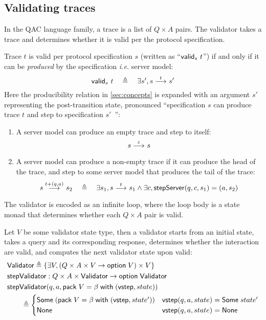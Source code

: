 \subsection{Validating traces}
In the QAC language family, a trace is a list of $Q\times A$ pairs.  The
validator takes a trace and determines whether it is valid per the protocol
specification.
\begin{definition}
  Trace $t$ is valid per protocol specification $s$ (written as ``$\mathsf{valid}_{s}~{t}$'') if and only if it can be {\em produced} by the specification {\it i.e.}
  server model:
  \[\mathsf{valid}_{s}~{t}\quad\triangleq\quad\exists s',s\overset{t}\longrightarrow_{} s'\]
  Here the producibility relation in \autoref{sec:concepts} is expanded with an
  argument $s'$ representing the post-transition state, pronounced
  ``specification $s$ can produce trace $t$ and step to specification $s'$~'':
  \begin{enumerate}
  \item A server model can produce an empty trace and step to itself:
    \[s\overset{\varepsilon}\longrightarrow_{} s\]
  \item A server model can produce a non-empty trace if it can produce the head
    of the trace, and step to some server model that produces the tail of the
    trace:
    \[s\overset{t+(q,a)}\longrightarrow_{} s_2\quad\triangleq\quad\exists s_1,s\overset{t}\longrightarrow_{} s_1\wedge
    \exists c,\mathsf{stepServer}(q,c,s_1)=(a,s_2)\]
  \end{enumerate}
\end{definition}

The validator is encoded as an infinite loop, where the loop body is a state
monad that determines whether each $Q\times A$ pair is valid.
\begin{definition}[Validator]
Let $V$ be some validator state type, then a validator starts from an initial
state, takes a query and its corresponding response, determines whether the
interaction are valid, and computes the next validator state upon valid:
\begin{align*}
  &\mathsf{Validator}\triangleq\{\exists V,(Q \times A \times V \to \mathsf{option}\; V) \times V\} \\
  &\mathsf{stepValidator}:Q\times A \times \mathsf{Validator} \to \mathsf{option}\; \mathsf{Validator} \\
  &\mathsf{stepValidator}(q,a,\mathsf{pack}\;V=\beta\;\mathsf{with}\;(\mathsf{vstep}, state))\\
  &\qquad\triangleq\begin{cases}
  \mathsf{Some}\;(\mathsf{pack}\;V=\beta\;\mathsf{with}\;(\mathsf{vstep},state')) & \mathsf{vstep}(q,a,state)=\mathsf{Some}\;state' \\
  \mathsf{None} & \mathsf{vstep}(q,a,state)=\mathsf{None}
  \end{cases}
\end{align*}
\end{definition}

